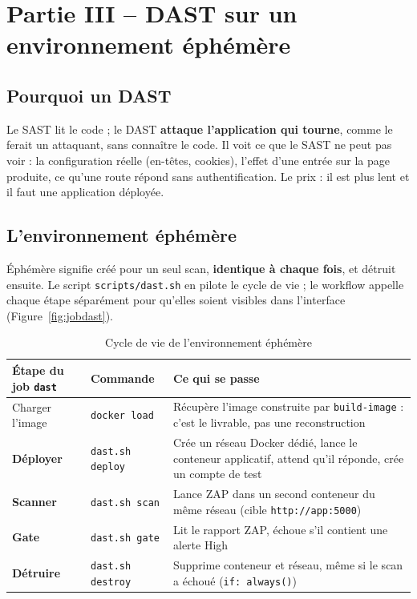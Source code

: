 \documentclass[11pt,a4paper]{article}
\newcommand{\code}[1]{\texttt{#1}}
\begin{document}
\section{Partie III -- DAST sur un environnement éphémère}
\subsection{Pourquoi un DAST}
Le SAST lit le code ; le DAST \textbf{attaque l'application qui tourne}, comme le ferait un
attaquant, sans connaître le code. Il voit ce que le SAST ne peut pas voir : la configuration réelle
(en-têtes, cookies), l'effet d'une entrée sur la page produite, ce qu'une route répond sans
authentification. Le prix : il est plus lent et il faut une application déployée.

\subsection{L'environnement éphémère}
\og Éphémère \fg{} signifie créé pour un seul scan, \textbf{identique à chaque fois}, et détruit
ensuite. Le script \code{scripts/dast.sh} en pilote le cycle de vie ; le workflow appelle chaque étape
séparément pour qu'elles soient visibles dans l'interface (Figure~\ref{fig:jobdast}).

\begin{table}[H]
\centering
\small
\begin{tabularx}{\textwidth}{@{}llL@{}}
\toprule
\textbf{Étape du job \code{dast}} & \textbf{Commande} & \textbf{Ce qui se passe} \\
\midrule
Charger l'image & \code{docker load} & Récupère l'image construite par \code{build-image} : c'est le livrable, pas une reconstruction \\
\textbf{Déployer} & \code{dast.sh deploy} & Crée un réseau Docker dédié, lance le conteneur applicatif, attend qu'il réponde, crée un compte de test \\
\textbf{Scanner} & \code{dast.sh scan} & Lance ZAP dans un second conteneur du même réseau (cible \code{http://app:5000}) \\
\textbf{Gate} & \code{dast.sh gate} & Lit le rapport ZAP, échoue s'il contient une alerte High \\
\textbf{Détruire} & \code{dast.sh destroy} & Supprime conteneur et réseau, même si le scan a échoué (\code{if: always()}) \\
\bottomrule
\end{tabularx}
\caption{Cycle de vie de l'environnement éphémère}
\end{table}
\end{document}
